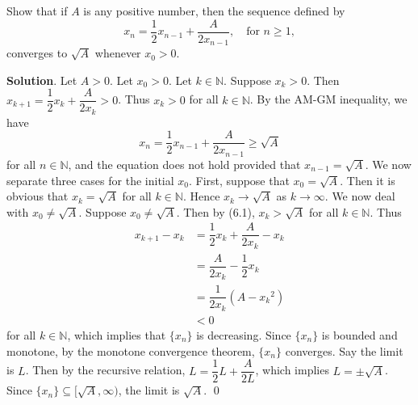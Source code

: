 \documentclass[11pt]{article}
\theoremstyle{break}
\numberwithin{equation}{theorem}
\begin{document}
\newpage
\begin{problem}\label{problem 6}
    Show that if $A$ is any positive number, then the sequence defined by
    \begin{equation*}
        x_n=\dfrac{1}{2}x_{n-1}+\dfrac{A}{2x_{n-1}},\quad\text{for $n\geq 1$},
    \end{equation*}
    converges to $\sqrt{A}$ whenever $x_0>0$.
\end{problem}
\textbf{Solution}. Let $A>0$. Let $x_0>0$. Let $k\in\mathbb{N}$. Suppose $x_k>0$. Then $x_{k+1}=\dfrac{1}{2}x_k+\dfrac{A}{2x_k}>0$. Thus $x_k>0$ for all $k\in\mathbb{N}$. By the AM-GM inequality, we have
\begin{equation}
    x_n=\dfrac{1}{2}x_{n-1}+\dfrac{A}{2x_{n-1}}\geq\sqrt{A}
\end{equation}
for all $n\in\mathbb{N}$, and the equation does not hold provided that $x_{n-1}=\sqrt{A}$. We now separate three cases for the initial $x_0$. First, suppose that $x_0=\sqrt{A}$. Then it is obvious that $x_k=\sqrt{A}$ for all $k\in\mathbb{N}$. Hence $x_k\to\sqrt{A}$ as $k\to\infty$. We now deal with $x_0\ne\sqrt{A}$. Suppose $x_0\ne\sqrt{A}$. Then by (6.1), $x_k>\sqrt{A}$ for all $k\in\mathbb{N}$. Thus
\begin{align*}
    x_{k+1}-x_{k}&=\dfrac{1}{2}x_{k}+\dfrac{A}{2x_{k}}-x_{k}\\
    &=\dfrac{A}{2x_{k}}-\dfrac{1}{2}x_{k}\\
    &=\dfrac{1}{2x_{k}}\left(A-{x_{k}}^2\right)\\
    &<0
\end{align*}
for all $k\in\mathbb{N}$, which implies that $\{x_n\}$ is decreasing. Since $\{x_n\}$ is bounded and monotone, by the monotone convergence theorem, $\{x_n\}$ converges. Say the limit is $L$. Then by the recursive relation, $L=\dfrac{1}{2}L+\dfrac{A}{2L}$, which implies $L=\pm\sqrt{A}$. Since $\{x_n\}\subseteq[\sqrt{A}, \infty)$, the limit is $\sqrt{A}$. \qed
\end{document}
